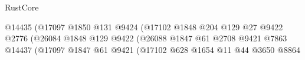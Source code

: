 \begin{lexlean}{RustCore}
\begin{coremodule}
                                                                @14435
                                                                (@17097
                                                                  @1850
                                                                  @131
                                                                  @9424
                                                                  (@17102
                                                                    @1848
                                                                    @204
                                                                    @129
                                                                    @27
                                                                    @9422
                                                                    @2776
                                                                    (@26084
                                                                      @1848
                                                                      @129
                                                                      @9422
                                                                      (@26088
                                                                        @1847
                                                                        @61
                                                                        @2708
                                                                        @9421
                                                                        @7863
                                                                        @14437
                                                                        (@17097
                                                                          @1847
                                                                          @61
                                                                          @9421
                                                                          (@17102
                                                                            @628
                                                                            @1654
                                                                            @11
                                                                            @44
                                                                            @3650
                                                                            @8864

\end{coremodule}
\end{lexlean}

